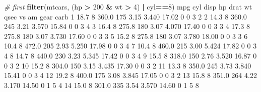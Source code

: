 \documentclass[]{article}
\newenvironment{Shaded}{\begin{snugshade}}{\end{snugshade}}
\newcommand{\CommentTok}[1]{\textcolor[rgb]{0.56,0.35,0.01}{\textit{#1}}}
\newcommand{\DecValTok}[1]{\textcolor[rgb]{0.00,0.00,0.81}{#1}}
\newcommand{\FloatTok}[1]{\textcolor[rgb]{0.00,0.00,0.81}{#1}}
\newcommand{\KeywordTok}[1]{\textcolor[rgb]{0.13,0.29,0.53}{\textbf{#1}}}
\newcommand{\NormalTok}[1]{#1}
\newcommand{\OperatorTok}[1]{\textcolor[rgb]{0.81,0.36,0.00}{\textbf{#1}}}
\newcommand{\StringTok}[1]{\textcolor[rgb]{0.31,0.60,0.02}{#1}}
\begin{document}
\begin{Shaded}
\begin{Highlighting}[]
\CommentTok{# first}
\KeywordTok{filter}\NormalTok{(mtcars, (hp }\OperatorTok{>}\StringTok{ }\DecValTok{200} \OperatorTok{&}\StringTok{ }\NormalTok{wt }\OperatorTok{>}\StringTok{ }\DecValTok{4}\NormalTok{) }\OperatorTok{|}\StringTok{ }\NormalTok{cyl}\OperatorTok{==}\DecValTok{8}\NormalTok{)}
\NormalTok{    mpg cyl  disp  hp drat    wt  qsec vs am gear carb}
\DecValTok{1}  \FloatTok{18.7}   \DecValTok{8} \FloatTok{360.0} \DecValTok{175} \FloatTok{3.15} \FloatTok{3.440} \FloatTok{17.02}  \DecValTok{0}  \DecValTok{0}    \DecValTok{3}    \DecValTok{2}
\DecValTok{2}  \FloatTok{14.3}   \DecValTok{8} \FloatTok{360.0} \DecValTok{245} \FloatTok{3.21} \FloatTok{3.570} \FloatTok{15.84}  \DecValTok{0}  \DecValTok{0}    \DecValTok{3}    \DecValTok{4}
\DecValTok{3}  \FloatTok{16.4}   \DecValTok{8} \FloatTok{275.8} \DecValTok{180} \FloatTok{3.07} \FloatTok{4.070} \FloatTok{17.40}  \DecValTok{0}  \DecValTok{0}    \DecValTok{3}    \DecValTok{3}
\DecValTok{4}  \FloatTok{17.3}   \DecValTok{8} \FloatTok{275.8} \DecValTok{180} \FloatTok{3.07} \FloatTok{3.730} \FloatTok{17.60}  \DecValTok{0}  \DecValTok{0}    \DecValTok{3}    \DecValTok{3}
\DecValTok{5}  \FloatTok{15.2}   \DecValTok{8} \FloatTok{275.8} \DecValTok{180} \FloatTok{3.07} \FloatTok{3.780} \FloatTok{18.00}  \DecValTok{0}  \DecValTok{0}    \DecValTok{3}    \DecValTok{3}
\DecValTok{6}  \FloatTok{10.4}   \DecValTok{8} \FloatTok{472.0} \DecValTok{205} \FloatTok{2.93} \FloatTok{5.250} \FloatTok{17.98}  \DecValTok{0}  \DecValTok{0}    \DecValTok{3}    \DecValTok{4}
\DecValTok{7}  \FloatTok{10.4}   \DecValTok{8} \FloatTok{460.0} \DecValTok{215} \FloatTok{3.00} \FloatTok{5.424} \FloatTok{17.82}  \DecValTok{0}  \DecValTok{0}    \DecValTok{3}    \DecValTok{4}
\DecValTok{8}  \FloatTok{14.7}   \DecValTok{8} \FloatTok{440.0} \DecValTok{230} \FloatTok{3.23} \FloatTok{5.345} \FloatTok{17.42}  \DecValTok{0}  \DecValTok{0}    \DecValTok{3}    \DecValTok{4}
\DecValTok{9}  \FloatTok{15.5}   \DecValTok{8} \FloatTok{318.0} \DecValTok{150} \FloatTok{2.76} \FloatTok{3.520} \FloatTok{16.87}  \DecValTok{0}  \DecValTok{0}    \DecValTok{3}    \DecValTok{2}
\DecValTok{10} \FloatTok{15.2}   \DecValTok{8} \FloatTok{304.0} \DecValTok{150} \FloatTok{3.15} \FloatTok{3.435} \FloatTok{17.30}  \DecValTok{0}  \DecValTok{0}    \DecValTok{3}    \DecValTok{2}
\DecValTok{11} \FloatTok{13.3}   \DecValTok{8} \FloatTok{350.0} \DecValTok{245} \FloatTok{3.73} \FloatTok{3.840} \FloatTok{15.41}  \DecValTok{0}  \DecValTok{0}    \DecValTok{3}    \DecValTok{4}
\DecValTok{12} \FloatTok{19.2}   \DecValTok{8} \FloatTok{400.0} \DecValTok{175} \FloatTok{3.08} \FloatTok{3.845} \FloatTok{17.05}  \DecValTok{0}  \DecValTok{0}    \DecValTok{3}    \DecValTok{2}
\DecValTok{13} \FloatTok{15.8}   \DecValTok{8} \FloatTok{351.0} \DecValTok{264} \FloatTok{4.22} \FloatTok{3.170} \FloatTok{14.50}  \DecValTok{0}  \DecValTok{1}    \DecValTok{5}    \DecValTok{4}
\DecValTok{14} \FloatTok{15.0}   \DecValTok{8} \FloatTok{301.0} \DecValTok{335} \FloatTok{3.54} \FloatTok{3.570} \FloatTok{14.60}  \DecValTok{0}  \DecValTok{1}    \DecValTok{5}    \DecValTok{8}


\end{Highlighting}
\end{Shaded}
\end{document}
